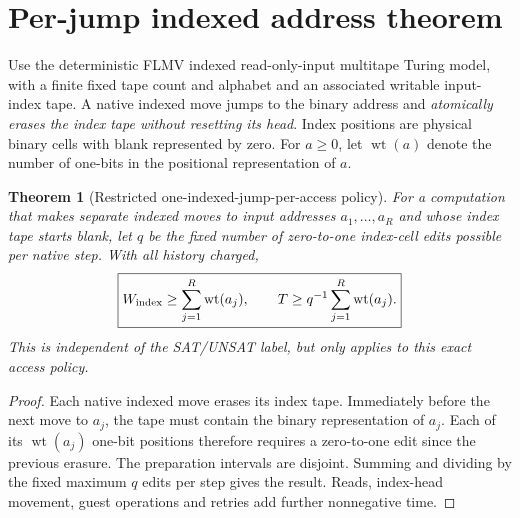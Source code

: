 \documentclass[10pt]{article}
\newtheorem{theorem}{Theorem}
\begin{document}
\section{Per-jump indexed address theorem}
Use the deterministic FLMV indexed read-only-input multitape Turing model, with a finite fixed tape count and alphabet and an associated writable input-index tape. A native indexed move jumps to the binary address and \emph{atomically erases the index tape without resetting its head}. Index positions are physical binary cells with blank represented by zero. For $a\ge0$, let $\operatorname{wt}(a)$ denote the number of one-bits in the positional representation of $a$.

\begin{theorem}[Restricted one-indexed-jump-per-access policy]
For a computation that makes separate indexed moves to input addresses $a_1,\ldots,a_R$ and whose index tape starts blank, let $q$ be the fixed number of zero-to-one index-cell edits possible per native step. With all history charged,
\[
\boxed{W_{\rm index}\ge\sum_{j=1}^R\operatorname{wt}(a_j),\qquad
T\ge q^{-1}\sum_{j=1}^R\operatorname{wt}(a_j).}
\]
This is independent of the SAT/UNSAT label, but only applies to this exact access policy.
\end{theorem}
\begin{proof}
Each native indexed move erases its index tape. Immediately before the next move to $a_j$, the tape must contain the binary representation of $a_j$. Each of its $\operatorname{wt}(a_j)$ one-bit positions therefore requires a zero-to-one edit since the previous erasure. The preparation intervals are disjoint. Summing and dividing by the fixed maximum $q$ edits per step gives the result. Reads, index-head movement, guest operations and retries add further nonnegative time.
\end{proof}
\end{document}
